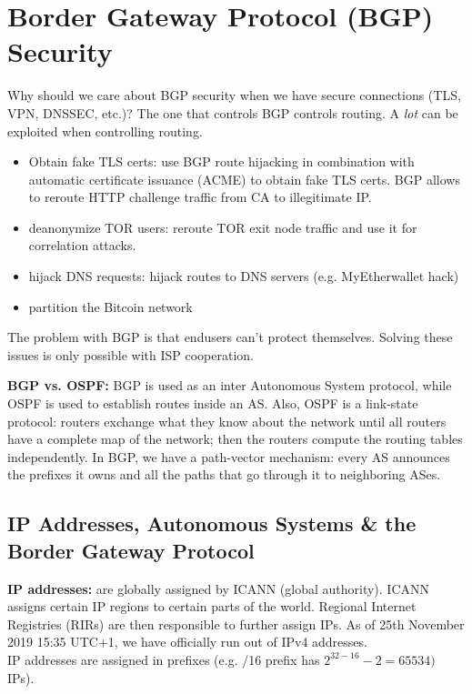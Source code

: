 \documentclass[11pt,oneside,a4paper]{article}
\begin{document}
\section{Border Gateway Protocol (BGP) Security}

Why should we care about BGP security when we have secure connections (TLS, VPN, DNSSEC, etc.)? The one that controls BGP controls routing. A \textit{lot} can be exploited when controlling routing.

\vspace{-\topsep}
\begin{itemize}
	\setlength{\itemsep}{0pt}
	\setlength{\parskip}{0pt}
	\item Obtain fake TLS certs: use BGP route hijacking in combination with automatic certificate issuance (ACME) to obtain fake TLS certs. BGP allows to reroute HTTP challenge traffic from CA to illegitimate IP.
	\item deanonymize TOR users: reroute TOR exit node traffic and use it for correlation attacks.
	\item hijack DNS requests: hijack routes to DNS servers (e.g. MyEtherwallet hack)
	\item partition the Bitcoin network
\end{itemize}
\vspace{-\topsep}

The problem with BGP is that endusers can't protect themselves. Solving these issues is only possible with ISP cooperation.

\newpage

\textbf{BGP vs. OSPF:} BGP is used as an inter Autonomous System protocol, while OSPF is used to establish routes inside an AS. Also, OSPF is a link-state protocol: routers exchange what they know about the network until all routers have a complete map of the network; then the routers compute the routing tables independently. In BGP, we have a path-vector mechanism: every AS announces the prefixes it owns and all the paths that go through it to neighboring ASes.

\subsection{IP Addresses, Autonomous Systems \& the Border Gateway Protocol}

\textbf{IP addresses:} are globally assigned by ICANN (global authority). ICANN assigns certain IP regions to certain parts of the world. Regional Internet Registries (RIRs) are then responsible to further assign IPs. As of 25th November 2019 15:35 UTC+1, we have officially run out of IPv4 addresses.\\
IP addresses are assigned in prefixes (e.g. /16 prefix has $2^{32-16} - 2= 65534)$ IPs).\\
\end{document}
